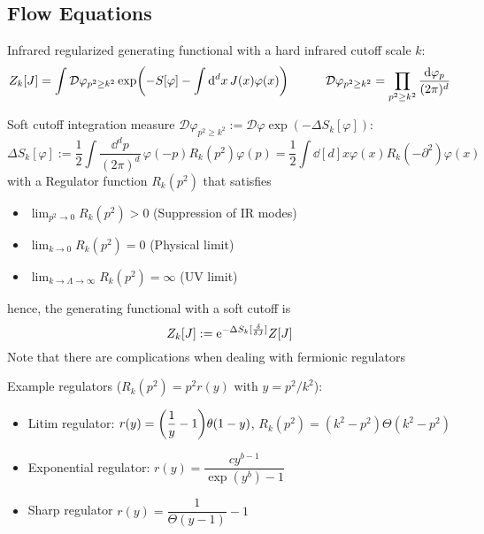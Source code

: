 	\subsection{Flow Equations}
		Infrared regularized generating functional with a hard infrared cutoff scale $k$:
		\begin{equation}
			Z_k[J] = \int \mathcal{D}\varphi_{p^2 \ge k^2} \exp(-S[\varphi] - \int \dd^d x \, J(x) \varphi(x))
			\hspace{30pt} \mathcal{D}\varphi_{p^2 \ge k^2} = \prod_{p^2 \ge k^2} \frac{\dd \varphi_p}{(2\pi)^d}
		\end{equation}

		\noindent
		Soft cutoff integration measure $\mathcal{D}\varphi_{p^2 \ge k^2} := \mathcal{D}\varphi \exp(-\Delta S_k[\varphi])$:
		\begin{equation}
			\Delta S_k[\varphi]
			:= \frac{1}{2} \int \frac{\dd^d p}{(2\pi)^d}\, \varphi(-p) R_k(p^2) \varphi(p)
			= \frac{1}{2} \int \dd[d]{x} \varphi(x) R_k(-\partial^2) \varphi(x)
		\end{equation}
		with a Regulator function $R_k(p^2)$ that satisfies
		\begin{itemize}\itemsep -0pt
			\item $\displaystyle\lim_{p^2 \to 0} R_k(p^2) > 0$ \hfill{(Suppression of IR modes)}
			\item $\displaystyle\lim_{k \to 0} R_k(p^2) = 0$ \hfill{(Physical limit)}
			\item $\displaystyle\lim_{k \to \Lambda \to \infty} R_k(p^2) = \infty$ \hfill{(UV limit)}
		\end{itemize}
		hence, the generating functional with a soft cutoff is
		\begin{equation}
			Z_k[J] := \ex^{-\Delta S_k [\fdv{J}]}Z[J]
		\end{equation}
		Note that there are complications when dealing with fermionic regulators

		\noindent
		Example regulators ($R_k(p^2) = p^2 r(y)$ with $y=p^2/k^2$):
		\begin{itemize} \itemsep -0pt
			\item Litim regulator: $r(y) = \qty(\dfrac{1}{y}-1)\theta(1-y)$, \ie $R_k(p^2) = (k^2 - p^2) \Theta(k^2 - p^2)$
			\item Exponential regulator: $r(y) = \dfrac{cy^{b-1}}{\exp(y^b) - 1}$
			\item Sharp regulator $r(y) = \dfrac{1}{\Theta(y-1)}-1$
		\end{itemize}

